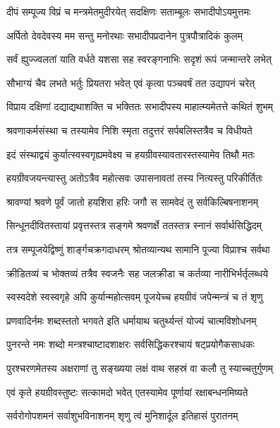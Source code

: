 \twolineshloka
{दीपं सम्पूज्य विप्रं च मन्त्रमेतमुदीरयेत्}
{सदक्षिणः सताम्बूलः सभादीपोऽयमुत्तमः} %

\twolineshloka
{अर्पितो देवदेवस्य मम सन्तु मनोरथाः}
{सभादीपप्रदानेन पुत्रपौत्रादिकं कुलम्} %

\twolineshloka
{सर्वं ह्युज्ज्वलतां याति वर्धते यशसा सह}
{स्वरङ्गनाभिः सदृशं रूपं जन्मान्तरे लभेत्} %

\twolineshloka
{सौभाग्यं चैव लभते भर्तुः प्रियतरा भवेत्}
{एवं कृत्वा पञ्चवर्षं तत उद्यापनं चरेत्} %

\twolineshloka
{विप्राय दक्षिणां दद्याद्यथाशक्ति च भक्तितः}
{सभादीपस्य माहात्म्यमेतत्ते कथितं शुभम्} %

\twolineshloka
{श्रवणाकर्मसंस्था च तस्यामेव निशि स्मृता}
{तदुत्तरं सर्पबलिस्तत्रैव च विधीयते} %

\twolineshloka
{इदं संस्थाद्वयं कुर्यात्स्वस्वगृह्यमवेक्ष्य च}
{हयग्रीवस्यावतारस्तस्यामेव तिथौ मतः} %

\twolineshloka
{हयग्रीवजयन्त्यास्तु अतोऽत्रैव महोत्सवः}
{उपासनावतां तस्य नित्यस्तु परिकीर्तितः} %

\twolineshloka
{श्रावण्यां श्रवणे पूर्वं जातो हयशिरा हरिः}
{जगौ स सामवेदं तु सर्वकिल्बिषनाशनम्} %

\twolineshloka
{सिन्धूनदीवितस्तायां प्रवृत्तस्तत्र सङ्गमे}
{श्रवणर्क्षे ततस्तत्र स्नानं सर्वार्थसिद्धिदम्} %

\twolineshloka
{तत्र सम्पूजयेद्विष्णुं शार्ङ्गचक्रगदाधरम्}
{श्रोतव्यान्यथ सामानि पूज्या विप्राश्च सर्वथा} %

\twolineshloka
{क्रीडितव्यं च भोक्तव्यं तत्रैव स्वजनैः सह}
{जलक्रीडा च कर्तव्या नारीभिर्भर्तृलब्धये} %

\twolineshloka
{स्वस्वदेशे स्वस्वगृहे अपि कुर्यान्महोत्सवम्}
{पूजयेच्च हयग्रीवं जपेन्मन्त्रं च तं शृणु} %

\twolineshloka
{प्रणवादिर्नमः शब्दस्ततो भगवते इति}
{धर्मायाथ चतुर्थ्यन्तं योज्यं चात्मविशोधनम्} %

\twolineshloka
{पुनरन्ते नमः शब्दो मन्त्रश्चाष्टादशाक्षरः}
{सर्वसिद्धिकरश्चायं षट्प्रयोगैकसाधकः} %

\twolineshloka
{पुरश्चरणमेतस्य अक्षराणां तु सङ्ख्यया}
{लक्षं वाथ सहस्रं वा कलौ तु स्याच्चतुर्गुणम्} %

\twolineshloka
{एवं कृते हयग्रीवस्तुष्टः सत्कामदो भवेत्}
{एतस्यामेव पूर्णायां रक्षाबन्धनमिष्यते} %

\twolineshloka
{सर्वरोगोपशमनं सर्वाशुभविनाशनम्}
{शृणु त्वं मुनिशार्दूल इतिहासं पुरातनम्} %

